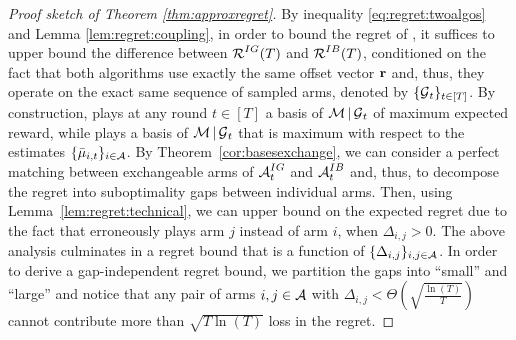\begin{proof}[Proof sketch of Theorem \ref{thm:approxregret}] 
By inequality \eqref{eq:regret:twoalgos} and Lemma \ref{lem:regret:coupling}, in order to bound the regret of \UCB, it suffices to upper bound the difference between $\operatorname{\mathcal{R}}^{IG}(T)$ and $\operatorname{\mathcal{R}}^{IB}(T)$, conditioned on the fact that both algorithms use exactly the same offset vector $\operatorname{\mathbf{r}}$ and, thus, they operate on the exact same sequence of sampled arms, denoted by $\{\operatorname{\mathcal{G}}_t\}_{t \in [T]}$. By construction, \IG plays at any round $t \in [T]$ a basis of $\operatorname{\mathcal{M}}|\operatorname{\mathcal{G}}_t$ of maximum expected reward, while \UCB plays a basis of $\operatorname{\mathcal{M}}|\operatorname{\mathcal{G}}_t$ that is maximum with respect to the estimates $\{\bar{\mu}_{i,t}\}_{i \in \operatorname{\mathcal{A}}}$. By Theorem~\ref{cor:basesexchange}, we can consider a perfect matching between exchangeable arms of $\operatorname{\mathcal{A}}^{IG}_t$ and $\operatorname{\mathcal{A}}^{IB}_t$ and, thus, to decompose the regret into suboptimality gaps between individual arms. Then, using Lemma~\ref{lem:regret:technical}, we can upper bound on the expected regret due to the fact that \UCB erroneously plays arm $j$ instead of arm $i$, when $\Delta_{i,j} > 0$. The above analysis culminates in a regret bound that is a function of $\{\Delta_{i,j}\}_{i,j\in \operatorname{\mathcal{A}}}$. In order to derive a gap-independent regret bound, we partition the gaps into ``small'' and ``large'' and notice that any pair of arms $i,j \in \operatorname{\mathcal{A}}$ with $\Delta_{i,j} < \Theta(\sqrt{\frac{\ln(T)}{T}})$ cannot contribute more than $\sqrt{T\ln(T)}$ loss in the regret.
\end{proof}
